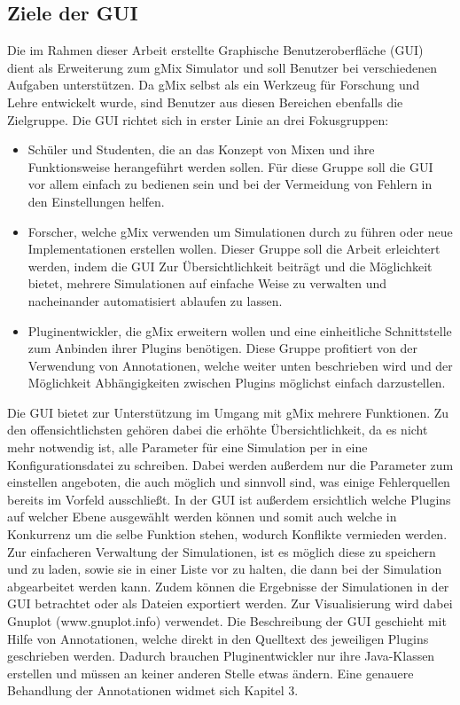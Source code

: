 \documentclass[a4paper, 11pt]{article} %
\begin{document}
\subsection{Ziele der GUI} %
\label{sub:ziele_der_gui}
Die im Rahmen dieser Arbeit erstellte Graphische Benutzeroberfläche (GUI) dient als Erweiterung zum gMix Simulator und soll Benutzer bei verschiedenen Aufgaben unterstützen. Da gMix selbst als ein Werkzeug für Forschung und Lehre entwickelt wurde, sind Benutzer aus diesen Bereichen ebenfalls die Zielgruppe. Die GUI richtet sich in erster Linie an drei Fokusgruppen:
\begin{itemize}
	\item Schüler und Studenten, die an das Konzept von Mixen und ihre Funktionsweise herangeführt werden sollen. Für diese Gruppe soll die GUI vor allem einfach zu bedienen sein und bei der Vermeidung von Fehlern in den Einstellungen helfen.
	\item Forscher, welche gMix verwenden um Simulationen durch zu führen oder neue Implementationen erstellen wollen. Dieser Gruppe soll die Arbeit erleichtert werden, indem die GUI Zur Übersichtlichkeit beiträgt und die Möglichkeit bietet, mehrere Simulationen auf einfache Weise zu verwalten und nacheinander automatisiert ablaufen zu lassen.
	\item Pluginentwickler, die gMix erweitern wollen und eine einheitliche Schnittstelle zum Anbinden ihrer Plugins benötigen. Diese Gruppe profitiert von der Verwendung von Annotationen, welche weiter unten beschrieben wird und der Möglichkeit Abhängigkeiten zwischen Plugins möglichst einfach darzustellen.
\end{itemize}

Die GUI bietet zur Unterstützung im Umgang mit gMix mehrere Funktionen. Zu den offensichtlichsten gehören dabei die erhöhte Übersichtlichkeit, da es nicht mehr notwendig ist, alle Parameter für eine Simulation per in eine Konfigurationsdatei zu schreiben. Dabei werden außerdem nur die Parameter zum einstellen angeboten, die auch möglich und sinnvoll sind, was einige Fehlerquellen bereits im Vorfeld ausschließt. In der GUI  ist außerdem ersichtlich welche Plugins auf welcher Ebene ausgewählt werden können und somit auch welche in Konkurrenz um die selbe Funktion stehen, wodurch Konflikte vermieden werden. Zur einfacheren Verwaltung der Simulationen, ist es möglich diese zu speichern und zu laden, sowie sie in einer Liste vor zu halten, die dann bei der Simulation abgearbeitet werden kann. Zudem können die Ergebnisse der Simulationen in der GUI betrachtet oder als Dateien exportiert werden. Zur Visualisierung wird dabei Gnuplot (www.gnuplot.info) verwendet. Die Beschreibung der GUI geschieht mit Hilfe von Annotationen, welche direkt in den Quelltext des jeweiligen Plugins geschrieben werden. Dadurch brauchen Pluginentwickler nur ihre Java-Klassen erstellen und müssen an keiner anderen Stelle etwas ändern. Eine genauere Behandlung der Annotationen widmet sich Kapitel 3.
\end{document}
